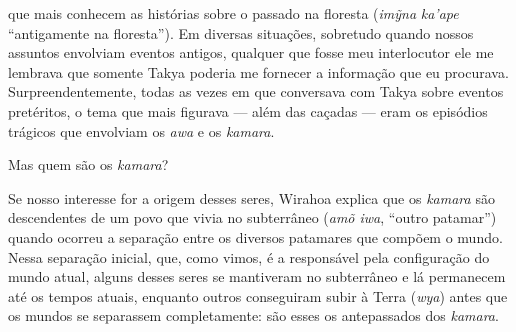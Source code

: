 que mais conhecem as histórias sobre o passado na floresta (\emph{imỹna}
\emph{ka'ape} ``antigamente na floresta''). Em diversas situações,
sobretudo quando nossos assuntos envolviam eventos antigos, qualquer que
fosse meu interlocutor ele me lembrava que somente Takya poderia me
fornecer a informação que eu procurava. Surpreendentemente, todas as
vezes em que conversava com Takya sobre eventos pretéritos, o tema que
mais figurava --- além das caçadas --- eram os episódios trágicos que
envolviam os \emph{awa} e os \emph{kamara}.

Mas quem são os \emph{kamara}?

Se nosso interesse for a origem desses seres, Wirahoa explica que os
\emph{kamara} são descendentes de um povo que vivia no subterrâneo
(\emph{amõ iwa}, ``outro patamar'') quando ocorreu a separação entre os
diversos patamares que compõem o mundo. Nessa separação inicial, que,
como vimos, é a responsável pela configuração do mundo atual, alguns
desses seres se mantiveram no subterrâneo e lá permanecem até os tempos
atuais, enquanto outros conseguiram subir à Terra (\emph{wya}) antes que
os mundos se separassem completamente: são esses os antepassados dos
\emph{kamara}.

